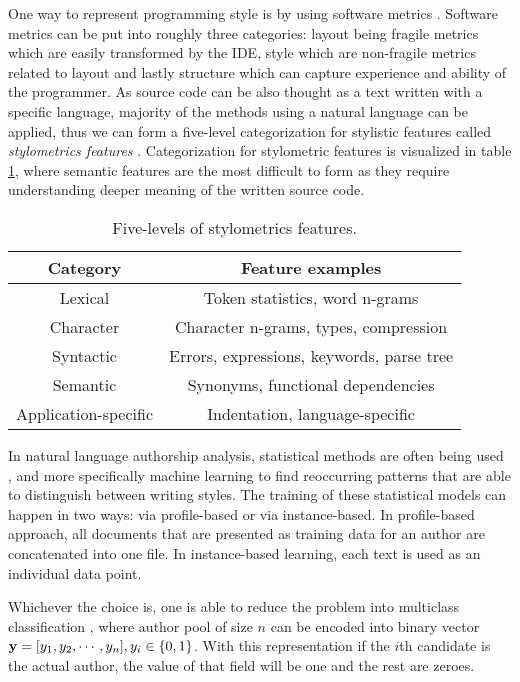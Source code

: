One way to represent programming style is by using software metrics \cite{KRSUL1997233}. Software metrics can be put into roughly three categories: layout being fragile metrics which are easily transformed by the IDE, style which are non-fragile metrics related to layout and lastly structure which can capture experience and ability of the programmer. As source code can be also thought as a text written with a specific language, majority of the methods using a natural language can be applied, thus we can form a five-level categorization for stylistic features called \emph{stylometrics features}  \cite{Stamatatos:2009:SMA:1527090.1527102}. Categorization for stylometric features is visualized in table \ref{tbl-ai-stylomet}, where semantic features are the most difficult to form as they require understanding deeper meaning of the written source code.

\begin{table}[ht]
\centering
\caption{Five-levels of stylometrics features. }
\label{tbl-ai-stylomet}
\begin{tabular}{|c|c|} \hline
\textbf{Category}             & \textbf{Feature examples} \\ \hline
Lexical              & Token statistics, word n-grams                   \\
Character            & Character n-grams, types, compression            \\
Syntactic            & Errors, expressions, keywords, parse tree        \\
Semantic             & Synonyms, functional dependencies                \\
Application-specific & Indentation, language-specific \\ \hline
\end{tabular}
\end{table}

In natural language authorship analysis, statistical methods are often being used \cite{Stamatatos:2009:SMA:1527090.1527102}, and more specifically machine learning to find reoccurring patterns that are able to distinguish between writing styles. The training of these statistical models can happen in two ways: via profile-based or via instance-based. In profile-based approach, all documents that are presented as training data for an author  are concatenated into one file. In instance-based learning, each text is used as an individual data point. 

Whichever the choice is, one is able to reduce the problem into multiclass classification \cite{Stamatatos:2009:SMA:1527090.1527102}, where author pool of size $n$ can be encoded into binary vector $\mathbf{y} = [y_1, y_2, \cdots, y_n], y_i \in \{0, 1\}$. With this representation if the $i$th candidate is the actual author, the value of that field will be one and the rest are zeroes. 



